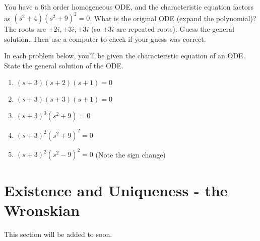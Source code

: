 \begin{problem}
 You have a 6th order homogeneous ODE, and the characteristic equation factors as $(s^2+4)(s^2+9)^2=0$. What is the original ODE (expand the polynomial)? The roots are $\pm 2i, \pm 3i, \pm 3i$ (so $\pm 3i$ are repeated roots). Guess the general solution.  Then use a computer to check if your guess was correct.
\end{problem}

\begin{problem}
 In each problem below, you'll be given the characteristic equation of an ODE. State the general solution of the ODE.
\begin{enumerate}
 \item $(s+3)(s+2)(s+1)=0$
 \item $(s+3)(s+3)(s+1)=0$
 \item $(s+3)^3(s^2+9)=0$
 \item $(s+3)^2(s^2+9)^2=0$
 \item $(s+3)^2(s^2-9)^2=0$ (Note the sign change)
\end{enumerate}
\end{problem}


\section{Existence and Uniqueness - the Wronskian}


This section will be added to soon.
